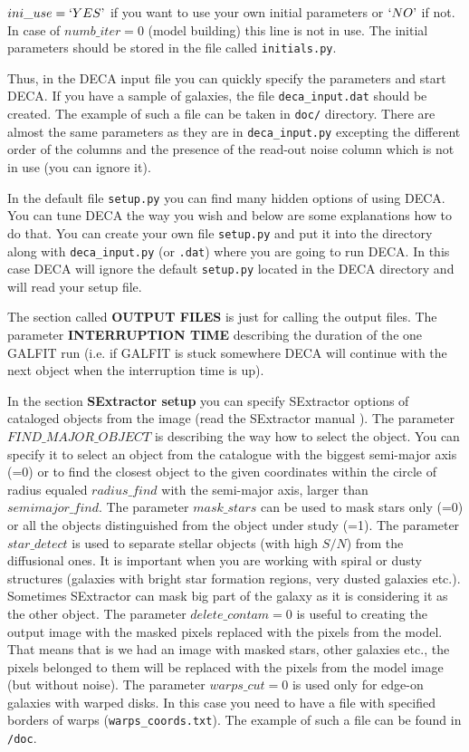 \documentclass[
aps,%
12pt,%
final,%
notitlepage,%
oneside,%
onecolumn,%
nobibnotes,%
nofootinbib,%
superscriptaddress,%
noshowpacs,%
centertags]%
{revtex4}
\begin{document}
$ini\_use=`YES\textrm'$ if you want to use your own initial parameters or $`NO\textrm'$ if not. In case of $numb\_iter = 0$ (model building) this line is not in use. The initial parameters should be stored in the file called \texttt{initials.py}.


Thus, in the DECA input file you can quickly specify the parameters and start DECA. If you have a sample of galaxies, the file \texttt{deca\_input.dat} should be created. The example of such a file can be taken in \texttt{doc/} directory. There are almost the same parameters as they are in \texttt{deca\_input.py} excepting the different order of the columns and the presence of the read-out noise column which is not in use (you can ignore it). 

In the default file \texttt{setup.py} you can find many hidden options of using DECA. You can tune DECA the way you wish and below are some explanations how to do that. You can create your own file \texttt{setup.py} and put it into the directory along with \texttt{deca\_input.py} (or \texttt{.dat}) where you are going to run DECA. In this case DECA will ignore the default \texttt{setup.py} located in the DECA directory and will read your setup file. 

The section called \textbf{OUTPUT FILES} is just for calling the output files. The parameter \textbf{INTERRUPTION TIME} describing the duration of the one GALFIT run (i.e. if GALFIT is stuck somewhere DECA will continue with the next object when the interruption time is up). 

In the section \textbf{SExtractor setup} you can specify SExtractor options of cataloged  objects from the image (read the SExtractor manual \cite{Bertin_manual}). The parameter $FIND\_MAJOR\_OBJECT$ is describing the way how to select the object. You can specify it to select an object from the catalogue with the biggest semi-major axis (=0) or to find the closest object to the given coordinates within the circle of radius equaled $radius\_find$ with the semi-major axis, larger than $semimajor\_find$.
The parameter $mask\_stars$ can be used to mask stars only (=0) or all the objects distinguished from the object under study (=1).
The parameter $star\_detect$ is used to separate stellar objects (with high $S/N$) from the diffusional ones. It is important when you are working with spiral or dusty structures (galaxies with bright star formation regions, very dusted galaxies etc.). Sometimes SExtractor can mask big part of the galaxy as it is considering it as the other object. 
The parameter $delete\_contam=0$ is useful to creating the output image with the masked pixels replaced with the pixels from the model. That means that is we had an image with masked stars, other galaxies etc., the pixels belonged to them will be replaced with the pixels from the model image (but without noise).
The parameter $warps\_cut=0$ is used only for edge-on galaxies with warped disks. In this case you need to have a file with specified  borders of warps (\texttt{warps\_coords.txt}). The example of such a file can be found in \texttt{/doc}.
\end{document}
